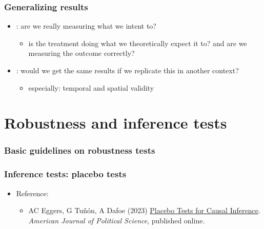 \documentclass[aspectratio=43]{beamer}
\begin{document}
\begin{frame}
\frametitle{Generalizing results}
\centering

\begin{itemize}
  \item {}: are we really measuring what we intent to?
  \begin{itemize}
    \item is the treatment doing what we theoretically expect it to? and are we measuring the outcome correctly?
  \end{itemize}
  \item {}: would we get the same results if we replicate this in another context?
  \begin{itemize}
    \item especially: temporal and spatial validity
  \end{itemize}
\end{itemize}

\end{frame}

\section{Robustness and inference tests}


\begin{frame}
\frametitle{Basic guidelines on robustness tests}
\centering



\end{frame}

\begin{frame}
\frametitle{Inference tests: placebo tests}
\centering

\begin{itemize}
  \item Reference:
  \begin{itemize}
    \item AC Eggers, G Tuñón, A Dafoe (2023) \href{https://doi.org/10.1111/ajps.12818}{Placebo Tests for Causal Inference}. \textit{American Journal of Political Science}, published online.
  \end{itemize}
\end{itemize}

\end{frame}
\end{document}
